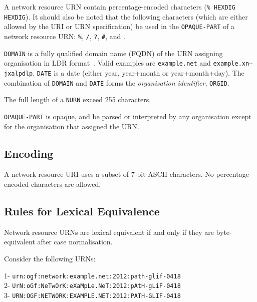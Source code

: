 \documentclass[12pt]{article}  %
\begin{document}
A network resource URN \MUSTNOT{} contain percentage-encoded characters (\texttt{\qq\%\qq{} HEXDIG HEXDIG}). It should also be noted that the following characters (which are either allowed by the URI or URN specification) \MUSTNOT{} be used in the \texttt{OPAQUE-PART} of a network resource URN: \texttt{\qq\%\qq}, \texttt{\qq/\qq}, \texttt{\qq{}?\qq}, \texttt{\qq\#\qq}, and \texttt{\qq{}\q{}\qq{}}. 


\texttt{DOMAIN} is a fully qualified domain name (FQDN) of the URN assigning organisation 
in LDR format~\cite{rfc5890}. 
Valid examples are \texttt{example.net} and \texttt{example.xn--jxalpdlp}. 
\texttt{DATE} is a date (either year, year+month or year+month+day).
The combination of \texttt{DOMAIN} and \texttt{DATE} forms the \emph{organisation identifier}, \texttt{ORGID}.

The full length of a \texttt{NURN} \MUSTNOT{} exceed 255 characters.

\texttt{OPAQUE-PART} is opaque, and \MUSTNOT{} be parsed or interpreted by any 
organisation except for the organisation that assigned the URN.

\subsection{Encoding}

A network resource URI uses a subset of 7-bit ASCII characters. 
No percentage-encoded characters are allowed.

\subsection{Rules for Lexical Equivalence}

Network resource URNs are lexical equivalent if and only if they are byte-equivalent after case normalisation.

Consider the following URNs:

  1- \texttt{urn:ogf:network:example.net:2012:path-glif-0418} \\
  2- \texttt{UrN:oGf:NeTwOrK:eXaMpLe.NeT:2012:pAtH-gLiF-0418} \\
  3- \texttt{URN:OGF:NETWORK:EXAMPLE.NET:2012:PATH-GLIF-0418} \\
\end{document}
